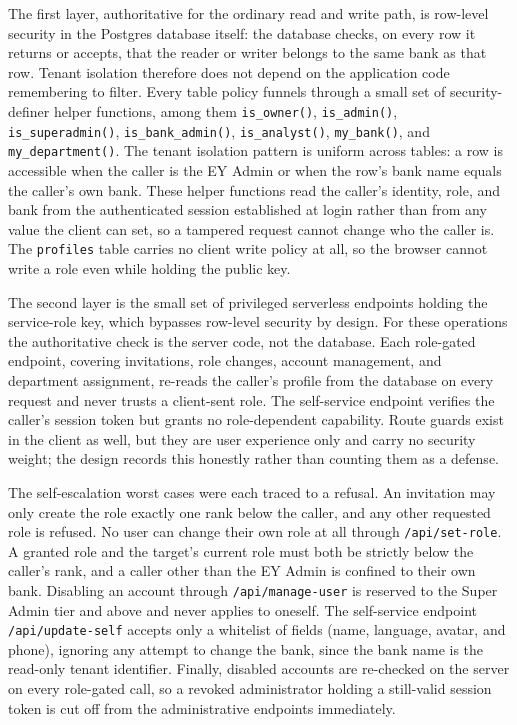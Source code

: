 \begin{sloppypar}
The first layer, authoritative for the ordinary read and write path, is row-level security in the Postgres database itself: the database checks, on every row it returns or accepts, that the reader or writer belongs to the same bank as that row. Tenant isolation therefore does not depend on the application code remembering to filter. Every table policy funnels through a small set of security-definer helper functions, among them \texttt{is\_owner()}, \texttt{is\_admin()}, \texttt{is\_superadmin()}, \texttt{is\_bank\_admin()}, \texttt{is\_analyst()}, \texttt{my\_bank()}, and \texttt{my\_department()}. The tenant isolation pattern is uniform across tables: a row is accessible when the caller is the EY Admin or when the row's bank name equals the caller's own bank. These helper functions read the caller's identity, role, and bank from the authenticated session established at login rather than from any value the client can set, so a tampered request cannot change who the caller is. The \texttt{profiles} table carries no client write policy at all, so the browser cannot write a role even while holding the public key.
\end{sloppypar}

The second layer is the small set of privileged serverless endpoints holding the service-role key, which bypasses row-level security by design. For these operations the authoritative check is the server code, not the database. Each role-gated endpoint, covering invitations, role changes, account management, and department assignment, re-reads the caller's profile from the database on every request and never trusts a client-sent role. The self-service endpoint verifies the caller's session token but grants no role-dependent capability. Route guards exist in the client as well, but they are user experience only and carry no security weight; the design records this honestly rather than counting them as a defense.

\begin{sloppypar}
The self-escalation worst cases were each traced to a refusal. An invitation may only create the role exactly one rank below the caller, and any other requested role is refused. No user can change their own role at all through \texttt{/api/set-role}. A granted role and the target's current role must both be strictly below the caller's rank, and a caller other than the EY Admin is confined to their own bank. Disabling an account through \texttt{/api/manage-user} is reserved to the Super Admin tier and above and never applies to oneself. The self-service endpoint \texttt{/api/update-self} accepts only a whitelist of fields (name, language, avatar, and phone), ignoring any attempt to change the bank, since the bank name is the read-only tenant identifier. Finally, disabled accounts are re-checked on the server on every role-gated call, so a revoked administrator holding a still-valid session token is cut off from the administrative endpoints immediately.
\end{sloppypar}

